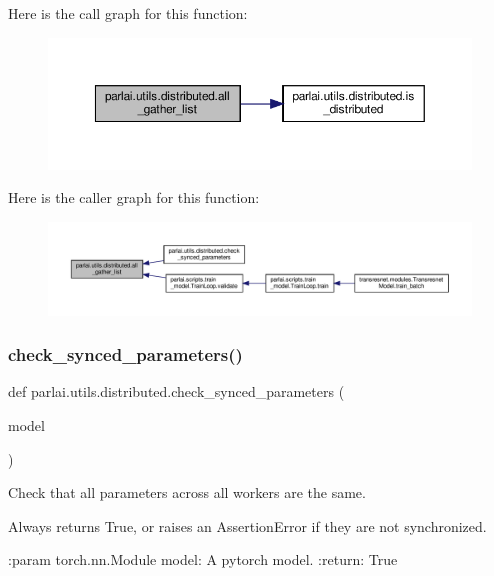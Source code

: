 Here is the call graph for this function\+:
\nopagebreak
\begin{figure}[H]
\begin{center}
\leavevmode
\includegraphics[width=350pt]{namespaceparlai_1_1utils_1_1distributed_a9ef5bf0debf512ddbeb045327bfd87ef_cgraph}
\end{center}
\end{figure}
Here is the caller graph for this function\+:
\nopagebreak
\begin{figure}[H]
\begin{center}
\leavevmode
\includegraphics[width=350pt]{namespaceparlai_1_1utils_1_1distributed_a9ef5bf0debf512ddbeb045327bfd87ef_icgraph}
\end{center}
\end{figure}
\mbox{\label{namespaceparlai_1_1utils_1_1distributed_afc64140f9a6437dc1a2b2bd4294ba8ef}} 
\subsubsection{\texorpdfstring{check\+\_\+synced\+\_\+parameters()}{check\_synced\_parameters()}}
{\footnotesize\ttfamily def parlai.\+utils.\+distributed.\+check\+\_\+synced\+\_\+parameters (\begin{DoxyParamCaption}\item[{}]{model }\end{DoxyParamCaption})}

\begin{DoxyVerb}Check that all parameters across all workers are the same.

Always returns True, or raises an AssertionError if they are not
synchronized.

:param torch.nn.Module model: A pytorch model.
:return: True
\end{DoxyVerb}
 

